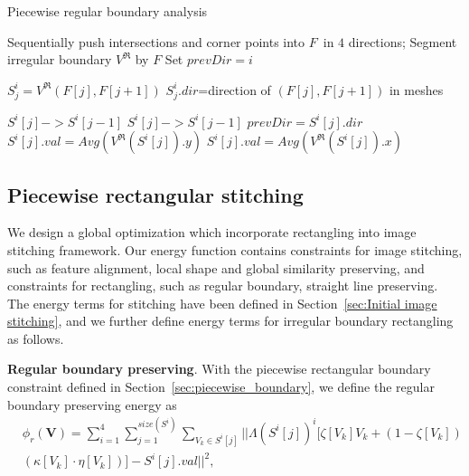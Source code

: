 \documentclass[10pt,journal,compsoc]{IEEEtran}
\begin{document}
\begin{algorithm}
 \label{alg:piecewise_analysis}
     \caption{Piecewise regular boundary analysis}
      Sequentially push intersections and corner points into $F$\ in $4$ directions;
      Segment irregular boundary $V^{\Re}$ by $F$\;
      Set $prevDir=i$\;
      {
           {
                $S_j^i=V^{\Re}(F[j], F[j+1])$\;
                $S_j^i.dir$=direction of $(F[j], F[j+1])$ in meshes\;
           }
           
          {
             {
                  $S^i[j] -> S^i[j-1]$\;
             }
             \Else
             {
                   {
                         $S^i[j] -> S^i[j-1]$\;
                   }
                   \Else
                   {
                        $prevDir =S^i[j].dir$\;
                   }
              }
               {
                    $S^i[j].val = Avg(V^{\Re}(S^i[j]).y)$\;
               }
               \Else
               {
                    $S^i[j].val = Avg(V^{\Re}(S^i[j]).x)$\;
               }
                              
            } 
               
      }
\end{algorithm}

\subsection{Piecewise rectangular stitching}
We design a global optimization which incorporate rectangling into image stitching framework.
Our energy function contains constraints for image stitching, such as feature alignment, local shape and global similarity preserving,
and constraints for rectangling, such as regular boundary, straight line preserving.
The energy terms for stitching have been defined in Section~\ref{sec:Initial image stitching}, and we further define energy terms for irregular boundary rectangling as follows.

\textbf{Regular boundary preserving}.
With the piecewise rectangular boundary constraint defined in Section~\ref{sec:piecewise_boundary}, we define the regular boundary preserving energy as
\begin{equation} \label{equ:piecewise_boundary}
\begin{split}
   &\phi_r(\mathbf{V})=\sum\limits_{i=1}^4\sum\limits_{j=1}^{size(S^i)}\sum\limits_{V_k \in S^i[j]}|| \Lambda(S^i[j])^i[\zeta[V_k] V_k+(1-\zeta[V_k])\\
   &(\kappa[V_k] \cdot \eta[V_k])]-S^i[j].val ||^2,
\end{split}
\end{equation}
\end{document}
